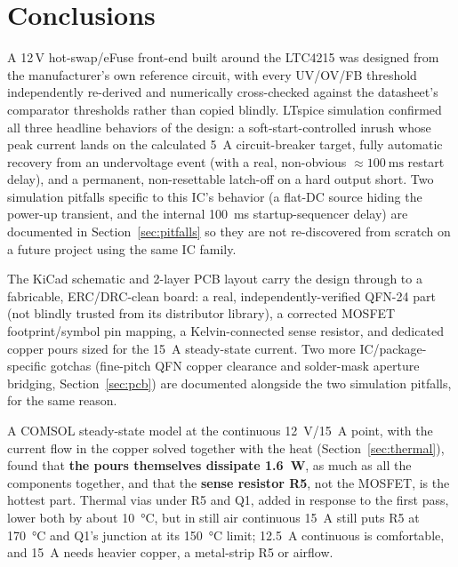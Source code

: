 \documentclass[11pt,letterpaper]{article}
\begin{document}
\section{Conclusions}

A 12\,V hot-swap/eFuse front-end built around the LTC4215 was designed from the manufacturer's own
reference circuit, with every UV/OV/FB threshold independently re-derived and numerically cross-checked
against the datasheet's comparator thresholds rather than copied blindly. LTspice simulation confirmed all
three headline behaviors of the design: a soft-start-controlled inrush whose peak current lands on the
calculated \SI{5}{\ampere} circuit-breaker target, fully automatic recovery from an undervoltage event
(with a real, non-obvious $\approx\SI{100}{\milli\second}$ restart delay), and a permanent, non-resettable
latch-off on a hard output short. Two simulation pitfalls specific to this IC's behavior (a flat-DC source
hiding the power-up transient, and the internal \SI{100}{\milli\second} startup-sequencer delay) are
documented in Section~\ref{sec:pitfalls} so they are not re-discovered from scratch on a future project
using the same IC family.

The KiCad schematic and 2-layer PCB layout carry the design through to a fabricable, ERC/DRC-clean board:
a real, independently-verified QFN-24 part (not blindly trusted from its distributor library), a corrected
MOSFET footprint/symbol pin mapping, a Kelvin-connected sense resistor, and dedicated copper pours sized
for the \SI{15}{\ampere} steady-state current. Two more IC/package-specific gotchas (fine-pitch QFN copper
clearance and solder-mask aperture bridging, Section~\ref{sec:pcb}) are documented alongside the two
simulation pitfalls, for the same reason.

A COMSOL steady-state model at the continuous \SI{12}{\volt}/\SI{15}{\ampere} point, with the current
flow in the copper solved together with the heat (Section~\ref{sec:thermal}), found that \textbf{the pours
themselves dissipate \SI{1.6}{\watt}}, as much as all the components together, and that the \textbf{sense
resistor R5}, not the MOSFET, is the hottest part. Thermal vias under R5 and Q1, added in response to the
first pass, lower both by about \SI{10}{\celsius}, but in still air continuous \SI{15}{\ampere} still puts
R5 at \SI{170}{\celsius} and Q1's junction at its \SI{150}{\celsius} limit; \SI{12.5}{\ampere} continuous
is comfortable, and \SI{15}{\ampere} needs heavier copper, a metal-strip R5 or airflow.
\end{document}
